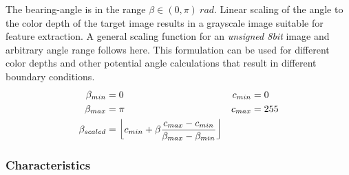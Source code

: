 The \Gls{bearing-angle} is in the range $\beta \in (0, \pi)~rad$.
Linear scaling of the angle to the color depth of the target image results in a grayscale image suitable for feature extraction.
A general scaling function for an \emph{unsigned 8bit} image and arbitrary angle range follows here.
This formulation can be used for different color depths and other potential angle calculations that result in different boundary conditions.
\begin{equation}
\begin{aligned}
\label{eq:linear_scaling}
    \beta_{min} &= 0 ~& c_{min} &= 0 \\
    \beta_{max} &= \pi ~& c_{max} &= 255 \\
    \beta_{scaled} &= \floor*{c_{min} + \beta \frac{c_{max} - c_{min}}{\beta_{max} - \beta_{min}}}
\end{aligned}
\end{equation}

\subsubsection*{Characteristics}

